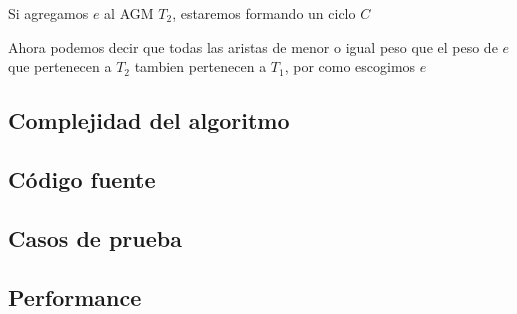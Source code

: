 Si agregamos $e$ al AGM $T_2$, estaremos formando un ciclo $C$

Ahora podemos decir que todas las aristas de menor o igual peso que el peso de $e$ que pertenecen a $T_2$ tambien pertenecen a $T_1$, por como escogimos $e$

\subsection{Complejidad del algoritmo}


\subsection{C\'odigo fuente}


\subsection{Casos de prueba}


\subsection{Performance}

